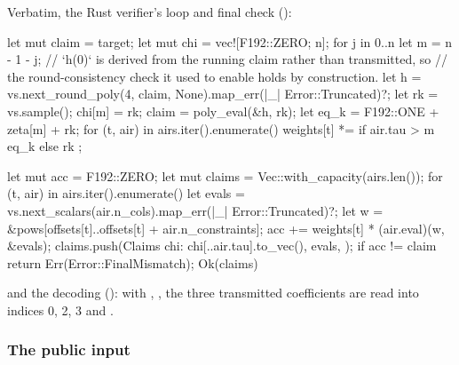 Verbatim, the Rust verifier's loop and final check ():

\begin{srccode}
    let mut claim = target;
    let mut chi = vec![F192::ZERO; n];
    for j in 0..n {
        let m = n - 1 - j;
        // `h(0)` is derived from the running claim rather than transmitted, so
        // the round-consistency check it used to enable holds by construction.
        let h = vs.next_round_poly(4, claim, None).map_err(|_| Error::Truncated)?;
        let rk = vs.sample();
        chi[m] = rk;
        claim = poly_eval(&h, rk);
        let eq_k = F192::ONE + zeta[m] + rk;
        for (t, air) in airs.iter().enumerate() {
            weights[t] *= if air.tau > m { eq_k } else { rk };
        }
    }

    let mut acc = F192::ZERO;
    let mut claims = Vec::with_capacity(airs.len());
    for (t, air) in airs.iter().enumerate() {
        let evals = vs.next_scalars(air.n_cols).map_err(|_| Error::Truncated)?;
        let w = &pows[offsets[t]..offsets[t] + air.n_constraints];
        acc += weights[t] * (air.eval)(w, &evals);
        claims.push(Claims {
            chi: chi[..air.tau].to_vec(),
            evals,
        });
    }
    if acc != claim {
        return Err(Error::FinalMismatch);
    }
    Ok(claims)
\end{srccode}

and the decoding (): with , , the
three transmitted coefficients are read into indices 0, 2, 3 and
.

\subsubsection{The public input}\label{sec:gen-table-pub-transcript-pub}

